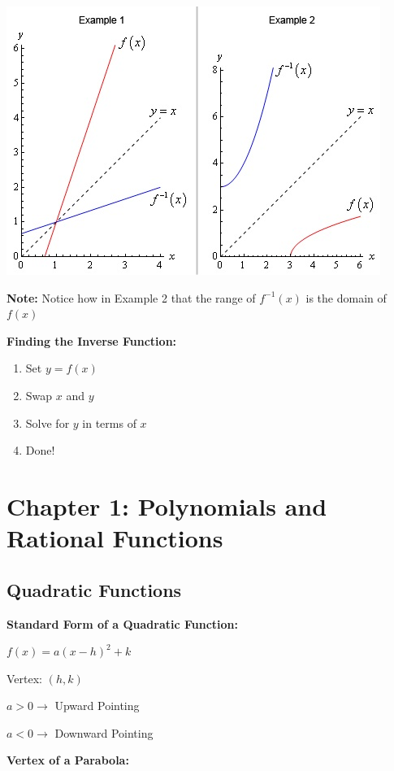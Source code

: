 \documentclass[12pt]{article}
\begin{document}
\includegraphics{InverseGraph.jpg}

\textbf{Note:} Notice how in Example 2 that the range of $f^{-1}(x)$ is the domain of $f(x)$

\textbf{Finding the Inverse Function:}

\begin{enumerate}
\item Set $y = f(x)$
\item Swap $x$ and $y$
\item Solve for $y$ in terms of $x$
\item Done!
\end{enumerate}

\section{Chapter 1: Polynomials and Rational Functions}

\subsection{Quadratic Functions}

\textbf{Standard Form of a Quadratic Function:}
\newline

\centerline{$f(x) = a(x-h)^{2} + k$}

\hspace{6.5cm} Vertex: $(h,k)$

\hspace{6.5cm} $a > 0 \to$ Upward Pointing

\hspace{6.5cm} $a < 0 \to$ Downward Pointing

\textbf{Vertex of a Parabola:}
\newline
\end{document}
